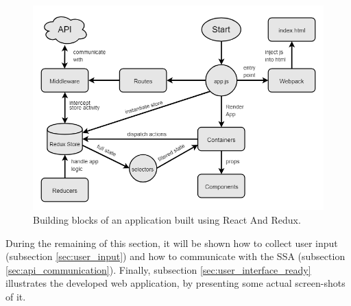 \begin{figure}[h!]
  \centering
  \includegraphics[width=.8\textwidth]{./Figures/system_implementation/react_redux_app.png}
  \caption{Building blocks of an application built using React And Redux.}
  \label{fig:react_redux_app}  
\end{figure}



During the remaining of this section, it will be shown how to collect user input (subsection \ref{sec:user_input}) and how to communicate with the SSA  (subsection \ref{sec:api_communication}). Finally, subsection \ref{sec:user_interface_ready} illustrates the developed web application, by presenting some actual screen-shots of it.



